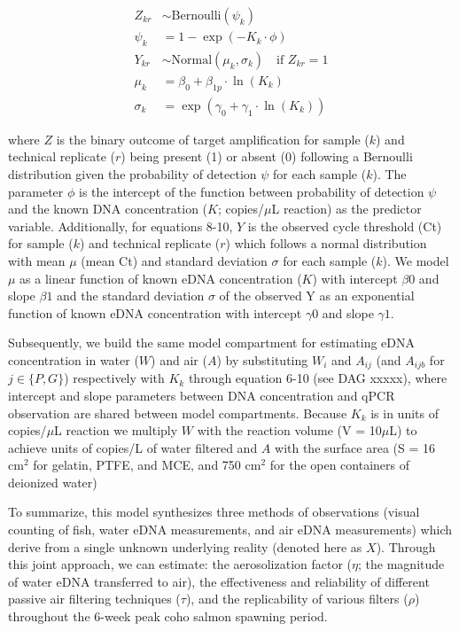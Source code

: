 \documentclass{article}
\begin{document}
\begin{align}
    Z_{kr} &\sim \mathrm{Bernoulli} \left(\psi_{k}\right)  \\
    \psi_{k} &= 1 - \exp(-K_{k} \cdot \phi) \\
    Y_{kr} &\sim \mathrm{Normal} (\mu_{k}, \sigma_{k}) \quad \text{if } Z_{kr} = 1 \\
    \mu_{k} &= \beta_0 + \beta_{1p} \cdot \ln (K_{k}) \\
    \sigma_{k} &= \exp(\gamma_0 + \gamma_1 \cdot \ln (K_{k}))
\end{align}

where $Z$ is the binary outcome of target amplification for sample ($k$) and technical replicate ($r$) being present (1) or absent (0) following a Bernoulli distribution given the probability of detection $\psi$ for each sample ($k$). The parameter $\phi$ is the intercept of the function between probability of detection $\psi$ and the known DNA concentration ($K$; copies/$\mu$L reaction) as the predictor variable. Additionally, for equations 8-10, $Y$ is the observed cycle threshold (Ct) for sample ($k$) and technical replicate ($r$) which follows a normal distribution with mean $\mu$ (mean Ct) and standard deviation $\sigma$ for each sample ($k$). We model $\mu$ as a linear function of known eDNA concentration ($K$) with intercept $\beta0$ and slope $\beta1$ and the standard deviation $\sigma$ of the observed Y as an exponential function of known eDNA concentration with intercept $\gamma0$ and slope $\gamma1$.

Subsequently, we build the same model compartment for estimating eDNA concentration in water ($W$) and air ($A$) by substituting $W_i$ and $A_{ij}$ (and $A_{ijb}$ for $j \in \{P,G\}$) respectively with $K_k$ through equation 6-10 (see DAG xxxxx), where intercept and slope parameters between DNA concentration and qPCR observation are shared between model compartments. Because $K_k$ is in units of copies/$\mu$L reaction we multiply $W$ with the reaction volume (V = 10$\mu$L) to achieve units of copies/L of water filtered and $A$ with the surface area (S = 16 cm$^2$ for gelatin, PTFE, and MCE, and 750 cm$^2$ for the open containers of deionized water)

To summarize, this model synthesizes three methods of observations (visual counting of fish, water eDNA measurements, and air eDNA measurements) which derive from a single unknown underlying reality (denoted here as $X$). Through this joint approach, we can estimate: the aerosolization factor ($\eta$; the magnitude of water eDNA transferred to air), the effectiveness and reliability of different passive air filtering techniques ($\tau$), and the replicability of various filters ($\rho$) throughout the 6-week peak coho salmon spawning period.
\end{document}
